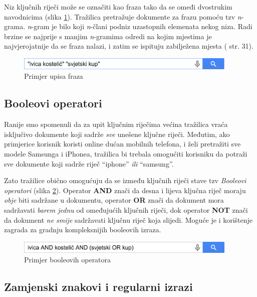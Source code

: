 \documentclass[a4paper,twoside,12pt]{scrreprt}
\begin{document}
Niz ključnih riječi može se označiti kao fraza tako da se omeđi dvostrukim navodnicima (slika \ref{phrases}). Tražilica pretražuje dokumente za frazu pomoću tzv \textit{n}-grama. \textit{n}-gram je bilo koji \textit{n}-člani podniz uzastopnih elemenata nekog niza. Radi brzine se najprije s manjim \textit{n}-gramima odredi na kojim mjestima je najvjerojatnije da se fraza nalazi, i zatim se ispituju zabilježena mjesta (\cite{taming} str. 31).

\begin{figure}[H]
  \centering
  \includegraphics[width=300pt]{phrases}
  \caption{Primjer upisa fraza}
  \label{phrases}
\end{figure}

\subsection{Booleovi operatori}

Ranije smo spomenuli da za upit ključnim riječima većina tražilica vraća isključivo dokumente koji sadrže \textit{sve} unešene ključne riječi. Međutim, ako primjerice korisnik koristi online dućan mobilnih telefona, i želi pretražiti sve modele Samsunga i iPhonea, tražilica bi trebala omogućiti korisniku da potraži sve dokumente koji sadrže riječ ``iphone'' \textit{ili} ``samsung''.

Zato tražilice obično omogućuju da se između ključnih riječi stave tzv \textit{Booleovi operatori} (slika \ref{boolean}). Operator \textbf{AND} znači da desna i lijeva ključna riječ moraju \textit{obje} biti sadržane u dokumentu, operator \textbf{OR} znači da dokument mora sadržavati \textit{barem jednu} od omeđujućih ključnih riječi, dok operator \textbf{NOT} znači da dokument \textit{ne smije} sadržavati ključnu riječ koja slijedi. Moguće je i korištenje zagrada za gradnju kompleksnijih booleovih izraza.

\begin{figure}[H]
  \centering
  \includegraphics[width=300pt]{boolean}
  \caption{Primjer booleovih operatora}
  \label{boolean}
\end{figure}

\subsection{Zamjenski znakovi i regularni izrazi}
\end{document}
